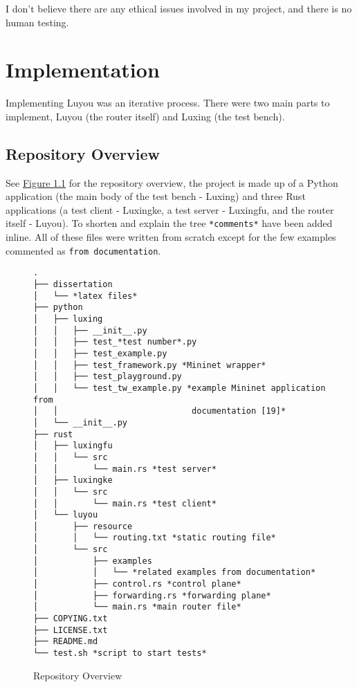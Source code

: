 \documentclass[12pt,a4paper,twoside,openany]{report}
\begin{document}
\bigskip

I don't believe there are any ethical issues involved in my project, and there is no human testing.

\chapter{Implementation}
\label{chap::implementation}

Implementing Luyou was an iterative process.  There were two main parts to implement, Luyou (the router itself) and Luxing (the test bench).

\section*{Repository Overview}

See \hyperref[fig::repository_overview]{Figure }\ref{fig::repository_overview} for the repository overview, the project is made up of a Python application (the main body of the test bench - Luxing) and three Rust applications (a test client - Luxingke, a test server - Luxingfu, and the router itself - Luyou). To shorten and explain the tree \verb!*comments*! have been added inline. All of these files were written from scratch except for the few examples commented as \verb!from documentation!. 

\begin{figure}
\begin{lstlisting}[style=tree]
.
├── dissertation
│   └── *latex files*
├── python
│   ├── luxing
│   │   ├── __init__.py
│   │   ├── test_*test number*.py
│   │   ├── test_example.py
│   │   ├── test_framework.py *Mininet wrapper*
│   │   ├── test_playground.py 
│   │   └── test_tw_example.py *example Mininet application from
│   │                           documentation [19]*
│   └── __init__.py
├── rust
│   ├── luxingfu
│   │   └── src
│   │       └── main.rs *test server*
│   ├── luxingke
│   │   └── src
│   │       └── main.rs *test client*
│   └── luyou
│       ├── resource
│       │   └── routing.txt *static routing file*
│       └── src
│           ├── examples
│           │   └── *related examples from documentation*
│           ├── control.rs *control plane*
│           ├── forwarding.rs *forwarding plane*
│           └── main.rs *main router file*
├── COPYING.txt
├── LICENSE.txt
├── README.md
└── test.sh *script to start tests*
\end{lstlisting}
\caption{Repository Overview}
\label{fig::repository_overview}
\end{figure}
\end{document}
